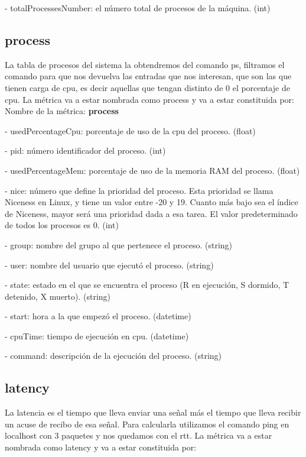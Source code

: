 \documentclass[ spanish, a4paper, 12pt, oneside]{report}
\begin{document}
\hyp{} totalProcessesNumber: el número total de procesos de la máquina. (int)

\subsection{process}
La tabla de procesos del sistema la obtendremos del comando ps, filtramos el comando para que nos devuelva 
las entradas que nos interesan, que son las que tienen carga de cpu, es decir aquellas que tengan distinto de 0 el porcentaje de cpu.
La métrica va a estar nombrada como process y va a estar constituida por:\\
  
Nombre de la métrica: \textbf{process}
  
\hyp{} usedPercentageCpu: porcentaje de uso de la cpu del proceso. (float)

\hyp{} pid: número identificador del proceso. (int)
  
\hyp{} usedPercentageMem: porcentaje de uso de la memoria RAM del proceso. (float)
  
\hyp{} nice: número que define la prioridad del proceso. Esta prioridad se llama Niceness en Linux, 
y tiene un valor entre -20 y 19. Cuanto más bajo sea el índice de Niceness, mayor será una prioridad dada a esa tarea.
El valor predeterminado de todos los procesos es 0. (int)

\hyp{} group: nombre del grupo al que pertenece el proceso. (string)

\hyp{} user: nombre del usuario que ejecutó el proceso. (string)

\hyp{} state: estado en el que se encuentra el proceso (R en ejecución, S dormido, T detenido, X muerto). (string)

\hyp{} start: hora a la que empezó el proceso. (datetime)
  
\hyp{} cpuTime: tiempo de ejecución en cpu. (datetime)
  
\hyp{} command: descripción de la ejecución del proceso. (string)


\subsection{latency}
La latencia es el tiempo que lleva enviar una señal más el tiempo que lleva recibir un acuse de recibo de esa señal.
Para calcularla utilizamos el comando ping en localhost con 3 paquetes y nos quedamos con el rtt. 
La métrica va a estar nombrada como latency y va a estar constituida por:\\
  
\end{document}
